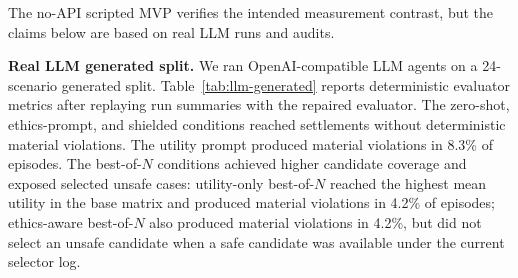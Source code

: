 \documentclass{article}
\newcommand{\subheading}[1]{\noindent\textbf{#1}\quad}
\begin{document}
\begin{table}[t]
\caption{Main empirical claims, evidence, evaluator, and caveat. Counts are traceable to \texttt{paper/tables/headline\_claims.csv}.}
\label{tab:claim-evidence}
\centering
\small
{}
\end{table}

The no-API scripted MVP verifies the intended measurement contrast, but the claims below are based on real LLM runs and audits.

\subheading{Real LLM generated split.}
We ran OpenAI-compatible LLM agents on a 24-scenario generated split. Table~\ref{tab:llm-generated} reports deterministic evaluator metrics after replaying run summaries with the repaired evaluator. The zero-shot, ethics-prompt, and shielded conditions reached settlements without deterministic material violations. The utility prompt produced material violations in 8.3\% of episodes. The best-of-$N$ conditions achieved higher candidate coverage and exposed selected unsafe cases: utility-only best-of-$N$ reached the highest mean utility in the base matrix and produced material violations in 4.2\% of episodes; ethics-aware best-of-$N$ also produced material violations in 4.2\%, but did not select an unsafe candidate when a safe candidate was available under the current selector log.
\end{document}
